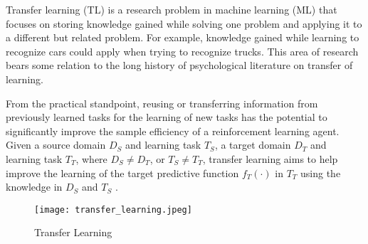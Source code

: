 \hspace{0.5cm} Transfer learning (TL) is a research problem in machine learning (ML) that focuses on storing knowledge gained while solving one problem and applying it to a different but related problem. For example, knowledge gained while learning to recognize cars could apply when trying to recognize trucks. This area of research bears some relation to the long history of psychological literature on transfer of learning.

From the practical standpoint, reusing or transferring information from previously learned tasks for the learning of new tasks has the potential to significantly improve the sample efficiency of a reinforcement learning agent. Given a source domain $D_S$ and learning task $T_S$, a target domain $D_T$ and learning task $T_T$, where $D_S \neq D_T$, or $T_S \neq T_T$, transfer learning aims to help improve the learning of the target predictive function $f_T(\cdot)$ in $T_T$ using the knowledge in $D_S$ and $T_S$ \cite{wiki:trnsflrn}.

\begin{figure}[!htbp]
    \centering
    \texttt{[image: transfer\_learning.jpeg]}
    \caption[Transfer Learning]{Transfer Learning}
    \label{fig:trnsflrnimg}
\end{figure}

\vspace*{\fill}